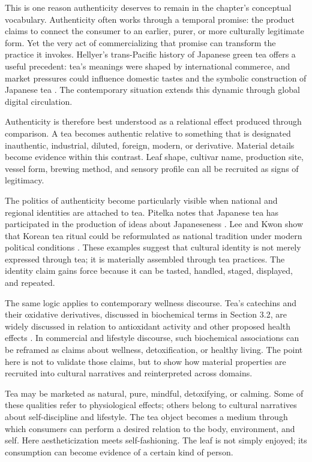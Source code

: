 \documentclass[numbers]{IntechOpen-Book}
\begin{document}
This is one reason authenticity deserves to remain in the chapter's conceptual vocabulary. Authenticity often works through a temporal promise: the product claims to connect the consumer to an earlier, purer, or more culturally legitimate form. Yet the very act of commercializing that promise can transform the practice it invokes. Hellyer's trans-Pacific history of Japanese green tea offers a useful precedent: tea's meanings were shaped by international commerce, and market pressures could influence domestic tastes and the symbolic construction of Japanese tea \cite{hellyer}. The contemporary situation extends this dynamic through global digital circulation.

Authenticity is therefore best understood as a relational effect produced through comparison. A tea becomes authentic relative to something that is designated inauthentic, industrial, diluted, foreign, modern, or derivative. Material details become evidence within this contrast. Leaf shape, cultivar name, production site, vessel form, brewing method, and sensory profile can all be recruited as signs of legitimacy.

The politics of authenticity become particularly visible when national and regional identities are attached to tea. Pitelka notes that Japanese tea has participated in the production of ideas about Japaneseness \cite{pitelka}. Lee and Kwon show that Korean tea ritual could be reformulated as national tradition under modern political conditions \cite{leekwon}. These examples suggest that cultural identity is not merely expressed through tea; it is materially assembled through tea practices. The identity claim gains force because it can be tasted, handled, staged, displayed, and repeated.

The same logic applies to contemporary wellness discourse. Tea's catechins and their oxidative derivatives, discussed in biochemical terms in Section 3.2, are widely discussed in relation to antioxidant activity and other proposed health effects \cite{sang2011}. In commercial and lifestyle discourse, such biochemical associations can be reframed as claims about wellness, detoxification, or healthy living. The point here is not to validate those claims, but to show how material properties are recruited into cultural narratives and reinterpreted across domains.

Tea may be marketed as natural, pure, mindful, detoxifying, or calming. Some of these qualities refer to physiological effects; others belong to cultural narratives about self-discipline and lifestyle. The tea object becomes a medium through which consumers can perform a desired relation to the body, environment, and self. Here aestheticization meets self-fashioning. The leaf is not simply enjoyed; its consumption can become evidence of a certain kind of person.
\end{document}
